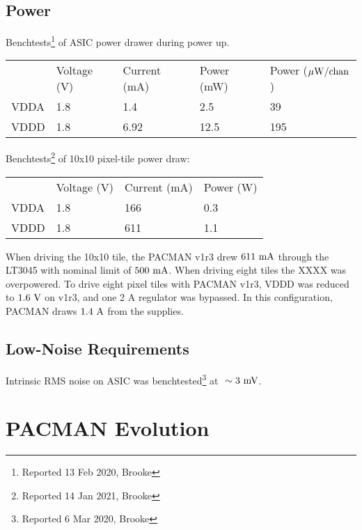 \documentclass[12pt]{article}
\begin{document}
\subsection{Power}

Benchtests\footnote{Reported 13 Feb 2020, Brooke} of ASIC power drawer during power up.
\begin{center}
\begin{tabular}{lllll}
   & Voltage (V) & Current (mA) & Power (mW) & Power ($\rm \mu W / chan$)\\
VDDA  & 1.8 & 1.4  & 2.5  & 39\\
VDDD  & 1.8 & 6.92 & 12.5 & 195\\
\end{tabular}
\end{center}

Benchtests\footnote{Reported 14 Jan 2021, Brooke} of 10x10 pixel-tile power draw:
\begin{center}
\begin{tabular}{llll}
   & Voltage (V) & Current (mA) & Power (W) \\
VDDA  & 1.8 & 166  & 0.3  \\
VDDD  & 1.8 & {\color{red} 611}  & 1.1  \\
\end{tabular}
\end{center}

When driving the 10x10 tile, the PACMAN v1r3 drew $611~\rm mA$ through
the LT3045 with nominal limit of $500~\rm mA$.  When driving eight tiles the XXXX was overpowered.  To drive eight pixel tiles with PACMAN v1r3, VDDD was reduced to $1.6~\rm V$ on v1r3, and one 2 A regulator was bypassed.  In this configuration, PACMAN draws $1.4~\rm A$ from the supplies.


\subsection{Low-Noise Requirements}

Intrinsic RMS noise on ASIC was benchtested\footnote{Reported 6 Mar
  2020, Brooke} at $~\sim 3~\rm mV$.



\appendix

\newpage
\section{PACMAN Evolution}
\end{document}
